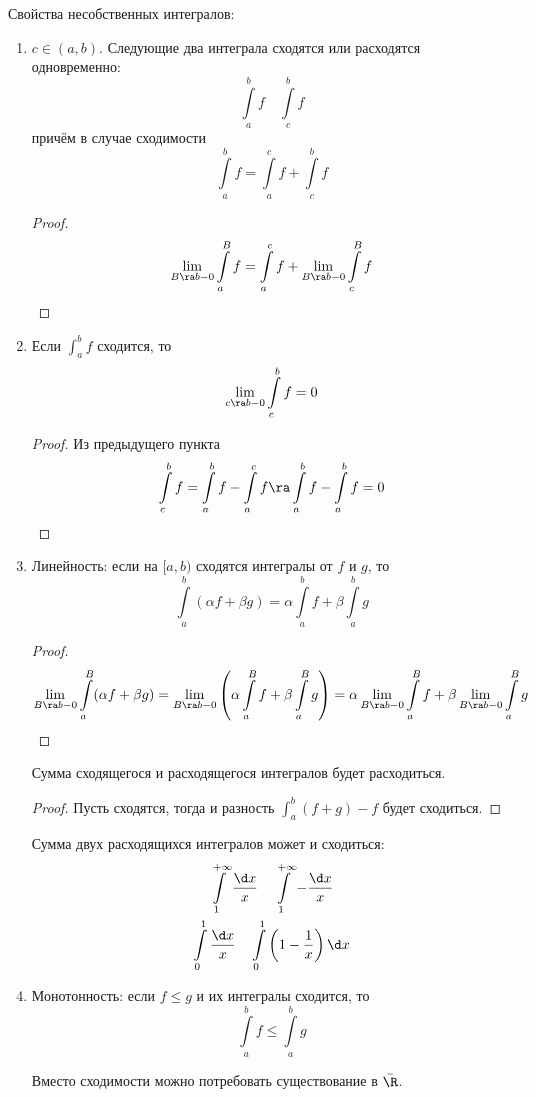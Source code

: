 Свойства несобственных интегралов:
\begin{enumerate}
\item
	$c \in (a, b)$. Следующие два интеграла сходятся или расходятся одновременно:
	\[ \int\limits_a^b f \quad \int\limits_c^b f \]
	причём в случае сходимости
	\[ \int\limits_a^b f = \int\limits_a^c f + \int\limits_c^b f \]
	\begin{proof}
		\[ \lim_{B\ra b-0} \int\limits_a^B f = \int\limits_a^c f + \lim_{B\ra b-0} \int\limits_c^B f \]
	\end{proof}

\item
	Если $\int_a^b f$ сходится, то
	\[ \lim_{c \ra b-0} \int\limits_c^b f = 0 \]
	\begin{proof}
		Из предыдущего пункта
		\[ \int\limits_c^b f = \int\limits_a^b f - \int\limits_a^c f \ra \int\limits_a^b f - \int\limits_a^b f = 0 \]
	\end{proof}

\item
	Линейность: если на $[a, b)$ сходятся интегралы от $f$ и $g$, то
	\[ \int\limits_a^b (\alpha f  + \beta g) = \alpha \int\limits_a^b f + \beta \int\limits_a^b g \]
	\begin{proof}
		\[
			\lim_{B\ra b-0} \int\limits_a^B (\alpha f + \beta g)
			= \lim_{B\ra b-0} \left(\alpha \int\limits_a^B f + \beta \int\limits_a^B g\right) 
			= \alpha \lim_{B\ra b-0} \int\limits_a^B f + \beta \lim_{B\ra b-0} \int\limits_a^B g
		\]
	\end{proof}
	\begin{Rem}
		Сумма сходящегося и расходящегося интегралов будет расходиться.
		\begin{proof}
			Пусть сходятся, тогда и разность $\int_a^b (f+g)-f$ будет сходиться.
		\end{proof}
	\end{Rem}

	\begin{Rem}
		Сумма двух расходящихся интегралов может и сходиться:
		\begin{gather*}
			\int\limits_1^{+\infty} \frac{\d x}x \quad \int\limits_1^{+\infty} -\frac{\d x}x \\
			\int\limits_0^1 \frac{\d x}x \quad \int\limits_0^1 \left(1-\frac1x\right) \d x \\
		\end{gather*}
	\end{Rem}

\item
	Монотонность: если $f \le g$ и их интегралы сходится, то
	\[ \int\limits_a^b f \le \int\limits_a^b g \]
	\begin{Rem}
		Вместо сходимости можно потребовать существование в $\bar \R$.
	\end{Rem}


\end{enumerate}
